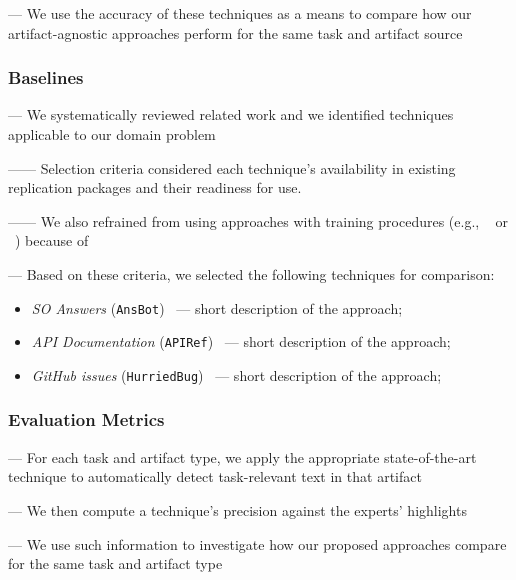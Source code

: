 --- We use the accuracy of these techniques as a means to compare how our artifact-agnostic approaches perform for the same task and artifact source



\subsubsection{Baselines}
\label{cp4:comparison-techniques}

--- We systematically reviewed related work and we identified techniques applicable to our domain problem

------ Selection criteria considered each technique's availability in existing replication packages and their readiness for use.

------ We also refrained from using approaches with training procedures (e.g., ~\cite{liu2020} or ~\cite{Treude2016}) because of ~\cite{Chaparro2017, fucci2019} \vspace{3mm}


--- Based on these criteria, we selected the following techniques for comparison:


\begin{itemize}[leftmargin=\parindent, font=\normalfont\itshape]
    \item \textit{SO Answers} (\texttt{AnsBot})~\cite{Xu2017} --- short description of the approach;
    
    \item \textit{API Documentation} (\texttt{APIRef})~\cite{Robillard2015} --- short description of the approach;
    
    \item \textit{GitHub issues} (\texttt{HurriedBug})~\cite{Lotufo2012} --- short description of the approach;
\end{itemize}





\subsubsection{Evaluation Metrics}

--- For each task and artifact type, we apply the appropriate state-of-the-art technique to automatically detect task-relevant text in that artifact

--- We then compute a technique's precision against the experts' highlights

--- We use such information to investigate how our proposed approaches compare for the same task and artifact type


